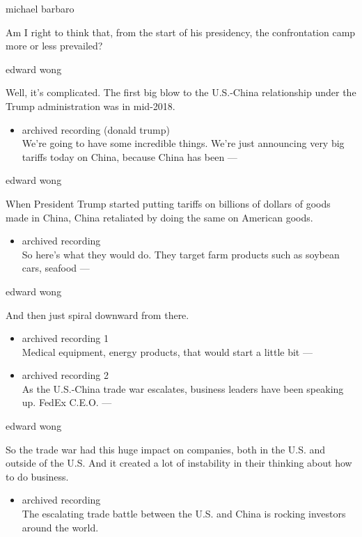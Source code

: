 michael barbaro

Am I right to think that, from the start of his presidency, the
confrontation camp more or less prevailed?

edward wong

Well, it's complicated. The first big blow to the U.S.-China
relationship under the Trump administration was in mid-2018.

\begin{itemize}
\tightlist
\item
  archived recording (donald trump)\\
  We're going to have some incredible things. We're just announcing very
  big tariffs today on China, because China has been ---
\end{itemize}

edward wong

When President Trump started putting tariffs on billions of dollars of
goods made in China, China retaliated by doing the same on American
goods.

\begin{itemize}
\tightlist
\item
  archived recording\\
  So here's what they would do. They target farm products such as
  soybean cars, seafood ---
\end{itemize}

edward wong

And then just spiral downward from there.

\begin{itemize}
\item
  archived recording 1\\
  Medical equipment, energy products, that would start a little bit ---
\item
  archived recording 2\\
  As the U.S.-China trade war escalates, business leaders have been
  speaking up. FedEx C.E.O. ---
\end{itemize}

edward wong

So the trade war had this huge impact on companies, both in the U.S. and
outside of the U.S. And it created a lot of instability in their
thinking about how to do business.

\begin{itemize}
\tightlist
\item
  archived recording\\
  The escalating trade battle between the U.S. and China is rocking
  investors around the world.
\end{itemize}

